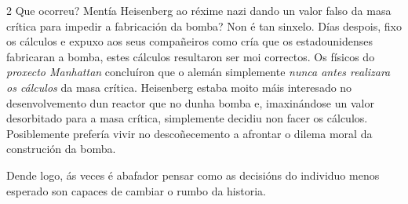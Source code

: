\begin{refsection}
\begin{multicols}{2}
Que ocorreu? Mentía Heisenberg ao réxime nazi dando un valor falso da masa
crítica para impedir a fabricación da bomba? Non é tan sinxelo. Días despois,
fixo os cálculos e expuxo aos seus compañeiros como cría que os estadounidenses
fabricaran a bomba, estes cálculos resultaron ser moi correctos. Os físicos do
\textit{proxecto Manhattan} concluíron que o alemán simplemente \textit{nunca
antes realizara os cálculos} da masa crítica. Heisenberg estaba moito máis
interesado no desenvolvemento dun reactor que no dunha bomba e, imaxinándose un
valor desorbitado para a masa crítica, simplemente decidiu non facer os
cálculos. Posiblemente prefería vivir no descoñecemento a afrontar o dilema
moral da construción da bomba.

Dende logo, ás veces é abafador pensar como as decisións do individuo menos
esperado son capaces de cambiar o rumbo da historia.

\nocite{gottstein.k_2016}
\nocite{dawidoff.n_2011}

\printbibliography

\end{multicols}
\end{refsection}
